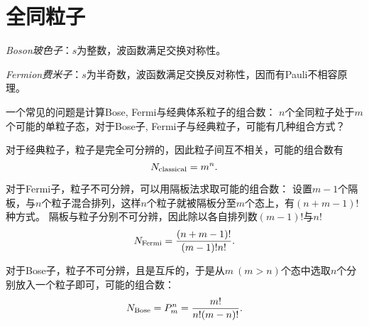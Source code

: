 \section{全同粒子}

\emph{Boson玻色子}：$s$为整数，波函数满足交换对称性。

\emph{Fermion费米子}：$s$为半奇数，波函数满足交换反对称性，因而有Pauli不相容原理。

一个常见的问题是计算Bose, Fermi与经典体系粒子的组合数：
$n$个全同粒子处于$m$个可能的单粒子态，对于Bose子, Fermi子与经典粒子，可能有几种组合方式？

对于经典粒子，粒子是完全可分辨的，因此粒子间互不相关，可能的组合数有
\begin{equation}
    N_{\rm{classical}} = m^n.
\end{equation}

对于Fermi子，粒子不可分辨，可以用隔板法求取可能的组合数：
设置$m-1$个隔板，与$n$个粒子混合排列，这样$n$个粒子就被隔板分至$m$个态上，有$(n+m-1)!$种方式。
隔板与粒子分别不可分辨，因此除以各自排列数$(m-1)!$与$n!$
\begin{equation}
    N_{\rm{Fermi}} = \frac{(n+m-1)!}{(m-1)! n!}.
\end{equation}

对于Bose子，粒子不可分辨，且是互斥的，于是从$m\ (m>n)$个态中选取$n$个分别放入一个粒子即可，可能的组合数：
\begin{equation}
    N_{\rm{Bose}} = P_m^n = \frac{m!}{n!(m-n)!}.
\end{equation}